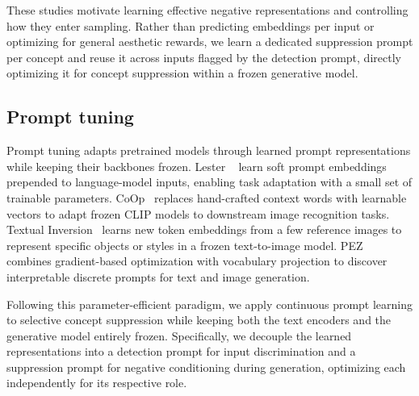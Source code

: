 These studies motivate learning effective negative representations and controlling how they enter sampling.
Rather than predicting embeddings per input or optimizing for general aesthetic rewards, we learn a dedicated suppression prompt per concept and reuse it across inputs flagged by the detection prompt, directly optimizing it for concept suppression within a frozen generative model.

\subsection{Prompt tuning}
Prompt tuning adapts pretrained models through learned prompt representations while keeping their backbones frozen.
Lester \etal~\cite{lester-etal-2021-power} learn soft prompt embeddings prepended to language-model inputs, enabling task adaptation with a small set of trainable parameters.
CoOp~\cite{zhou2022coop} replaces hand-crafted context words with learnable vectors to adapt frozen CLIP models to downstream image recognition tasks.
Textual Inversion~\cite{Gal_TextualInversion} learns new token embeddings from a few reference images to represent specific objects or styles in a frozen text-to-image model.
PEZ~\cite{NEURIPS2023_a0054803} combines gradient-based optimization with vocabulary projection to discover interpretable discrete prompts for text and image generation.

Following this parameter-efficient paradigm, we apply continuous prompt learning to selective concept suppression while keeping both the text encoders and the generative model entirely frozen.
Specifically, we decouple the learned representations into a detection prompt for input discrimination and a suppression prompt for negative conditioning during generation, optimizing each independently for its respective role.